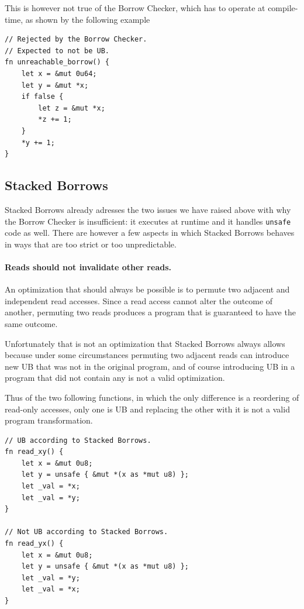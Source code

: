 \documentclass[a4paper,11pt]{article}
\theoremstyle{plain}
\theoremstyle{definition}
\theoremstyle{remark}
\newcommand{\tcode}[1]{\texttt{#1}}
\begin{document}
This is however not true of the Borrow Checker, which has to operate at compile-time,
as shown by the following example
\begin{lstlisting}
// Rejected by the Borrow Checker.
// Expected to not be UB.
fn unreachable_borrow() {
    let x = &mut 0u64;
    let y = &mut *x;
    if false {
        let z = &mut *x;
        *z += 1;
    }
    *y += 1;
}
\end{lstlisting}

\subsection{Stacked Borrows}

Stacked Borrows already adresses the two issues we have raised above with
why the Borrow Checker is insufficient: it executes at runtime and it handles
\tcode{unsafe} code as well. There are however a few aspects in which
Stacked Borrows behaves in ways that are too strict or too unpredictable.

\paragraph*{Reads should not invalidate other reads.}
An optimization that should always be possible is to permute two adjacent and independent
read accesses. Since a read access cannot alter the outcome of another, permuting
two reads produces a program that is guaranteed to have the same outcome.

Unfortunately that is not an optimization that Stacked Borrows always allows
because under some circumstances permuting two adjacent reads can introduce new
UB that was not in the original program, and of course introducing UB in a program
that did not contain any is not a valid optimization.

Thus of the two following functions, in which the only difference is a reordering
of read-only accesses, only one is UB and replacing the other with it is not
a valid program transformation.
\begin{lstlisting}
// UB according to Stacked Borrows.
fn read_xy() {
    let x = &mut 0u8;
    let y = unsafe { &mut *(x as *mut u8) };
    let _val = *x;
    let _val = *y;
}

// Not UB according to Stacked Borrows.
fn read_yx() {
    let x = &mut 0u8;
    let y = unsafe { &mut *(x as *mut u8) };
    let _val = *y;
    let _val = *x;
}
\end{lstlisting}
\end{document}
